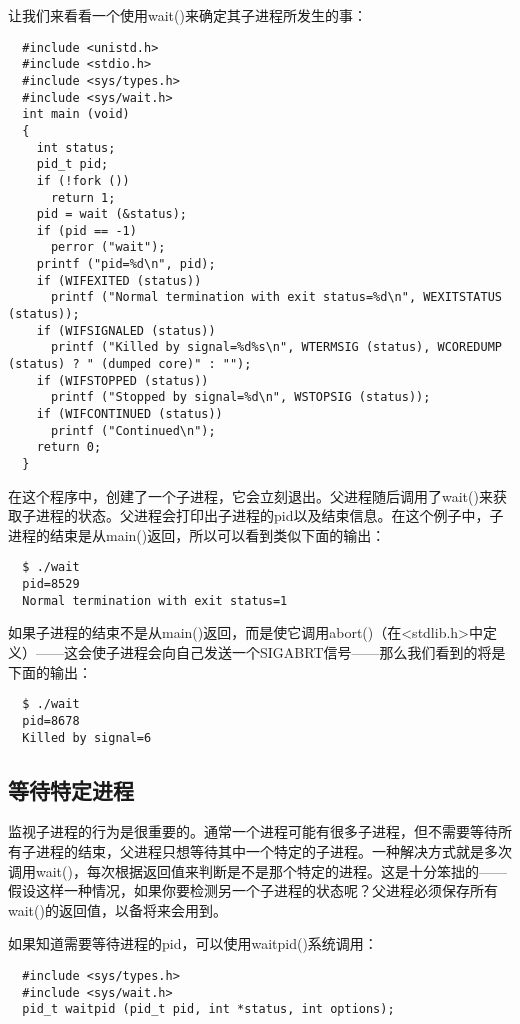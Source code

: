 让我们来看看一个使用wait()来确定其子进程所发生的事：

\begin{lstlisting}
  #include <unistd.h>
  #include <stdio.h>
  #include <sys/types.h>
  #include <sys/wait.h>
  int main (void)
  {
    int status;
    pid_t pid;
    if (!fork ())
      return 1;
    pid = wait (&status);
    if (pid == -1)
      perror ("wait");
    printf ("pid=%d\n", pid);
    if (WIFEXITED (status))
      printf ("Normal termination with exit status=%d\n", WEXITSTATUS (status));
    if (WIFSIGNALED (status))
      printf ("Killed by signal=%d%s\n", WTERMSIG (status), WCOREDUMP (status) ? " (dumped core)" : "");
    if (WIFSTOPPED (status))
      printf ("Stopped by signal=%d\n", WSTOPSIG (status));
    if (WIFCONTINUED (status))
      printf ("Continued\n");
    return 0;
  }
\end{lstlisting}

在这个程序中，创建了一个子进程，它会立刻退出。父进程随后调用了wait()来获取子进程的状态。父进程会打印出子进程的pid以及结束信息。在这个例子中，子进程的结束是从main()返回，所以可以看到类似下面的输出：

\begin{verbatim}
  $ ./wait
  pid=8529
  Normal termination with exit status=1
\end{verbatim}

如果子进程的结束不是从main()返回，而是使它调用abort()（在<stdlib.h>中定义）——这会使子进程会向自己发送一个SIGABRT信号——那么我们看到的将是下面的输出：

\begin{verbatim}
  $ ./wait
  pid=8678
  Killed by signal=6
\end{verbatim}

\subsection{等待特定进程}

监视子进程的行为是很重要的。通常一个进程可能有很多子进程，但不需要等待所有子进程的结束，父进程只想等待其中一个特定的子进程。一种解决方式就是多次调用wait()，每次根据返回值来判断是不是那个特定的进程。这是十分笨拙的——假设这样一种情况，如果你要检测另一个子进程的状态呢？父进程必须保存所有wait()的返回值，以备将来会用到。

如果知道需要等待进程的pid，可以使用waitpid()系统调用：

\begin{lstlisting}
  #include <sys/types.h>
  #include <sys/wait.h>
  pid_t waitpid (pid_t pid, int *status, int options);
\end{lstlisting}

